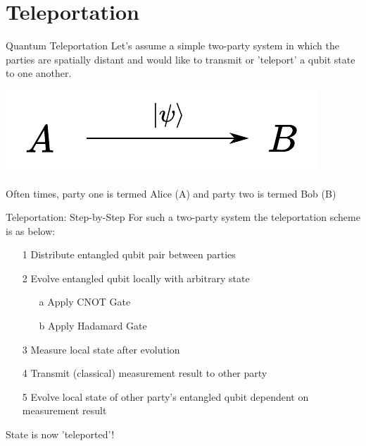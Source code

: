 \documentclass[11pt]{beamer}
\begin{document}
\section{Teleportation}
\begin{frame}{Quantum Teleportation}
Let's assume a simple two-party system in which the parties are spatially distant and would like to transmit or 'teleport' a qubit state to one another.

\vspace{0.7cm}

\begin{center}
\includegraphics[scale=0.7]{teleschematic.pdf}
\end{center}

\vspace{0.7cm}\pause

Often times, party one is termed Alice (A) and party two is termed Bob (B)
\end{frame}

\begin{frame}{Teleportation: Step-by-Step}
For such a two-party system the teleportation scheme is as below:\pause

\vspace{.5cm}

\begin{itemize}
\item[1]Distribute entangled qubit pair between parties \pause

\item[2]Evolve entangled qubit locally with arbitrary state
\begin{itemize}
\item[a] Apply CNOT Gate
\item[b] Apply Hadamard Gate
\end{itemize}\pause
\item[3]Measure local state after evolution\pause
\item[4]Transmit (classical) measurement result to other party\pause
\item[5]Evolve local state of other party's entangled qubit dependent on measurement result\pause
\end{itemize}

\vspace{.5cm}
\begin{center}
State is now 'teleported'!
\end{center}

\end{frame}
\end{document}
